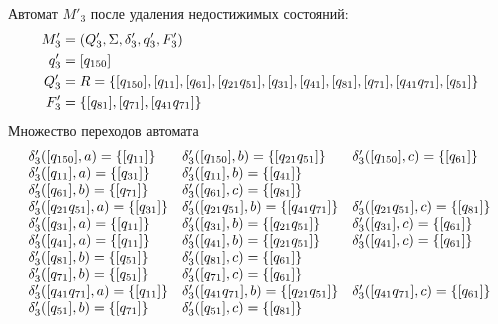 Автомат \(M'_3\) после удаления недостижимых состояний:
\begin{align*}
	M'_3 & = (Q'_3, \Sigma, \delta'_3, q'_3, F'_3)                                                                                   \\
	q'_3 & = [q_{150}]                                                                                                               \\
	Q'_3 & = R = \left\{[q_{150}], [q_{11}],[q_{61}], [q_{21}q_{51}],[q_{31}], [q_{41}], [q_{81}], [q_{71}], [q_{41}q_{71}], [q_{51}]\right\} \\
	F'_3 & = \left\{ [q_{81}], [q_{71}], [q_{41}q_{71}]\right\}
\end{align*}
Множество переходов автомата
\begin{align*}
	\begin{array}{lll}
		\delta'_3([q_{150}], a) = \left\{[q_{11}]\right\}      & \delta'_3([q_{150}], b) = \left\{[q_{21}q_{51}]\right\}      & \delta'_3([q_{150}], c) = \left\{[q_{61}]\right\}      \\
		\delta'_3([q_{11}], a) = \left\{[q_{31}]\right\}       & \delta'_3([q_{11}], b) = \left\{[q_{41}]\right\}                                                             \\
		\delta'_3([q_{61}], b) = \left\{[q_{71}]\right\}       & \delta'_3([q_{61}], c) = \left\{[q_{81}]\right\}                                                             \\
		\delta'_3([q_{21}q_{51}], a) = \left\{[q_{31}]\right\} & \delta'_3([q_{21}q_{51}], b) = \left\{[q_{41}q_{71}]\right\} & \delta'_3([q_{21}q_{51}], c) = \left\{[q_{81}]\right\} \\
		\delta'_3([q_{31}], a) = \left\{[q_{11}]\right\}       & \delta'_3([q_{31}], b) = \left\{[q_{21}q_{51}]\right\}       & \delta'_3([q_{31}], c) = \left\{[q_{61}]\right\}       \\
		\delta'_3([q_{41}], a) = \left\{[q_{11}]\right\}       & \delta'_3([q_{41}], b) = \left\{[q_{21}q_{51}]\right\}       & \delta'_3([q_{41}], c) = \left\{[q_{61}]\right\}       \\
		\delta'_3([q_{81}], b) = \left\{[q_{51}]\right\}       & \delta'_3([q_{81}], c) = \left\{[q_{61}]\right\}                                                             \\
		\delta'_3([q_{71}], b) = \left\{[q_{51}]\right\}       & \delta'_3([q_{71}], c) = \left\{[q_{61}]\right\}                                                             \\
		\delta'_3([q_{41}q_{71}], a) = \left\{[q_{11}]\right\} & \delta'_3([q_{41}q_{71}], b) = \left\{[q_{21}q_{51}]\right\} & \delta'_3([q_{41}q_{71}], c) = \left\{[q_{61}]\right\} \\
		\delta'_3([q_{51}], b) = \left\{[q_{71}]\right\}       & \delta'_3([q_{51}], c) = \left\{[q_{81}]\right\}                                                             \\
	\end{array}
\end{align*}
